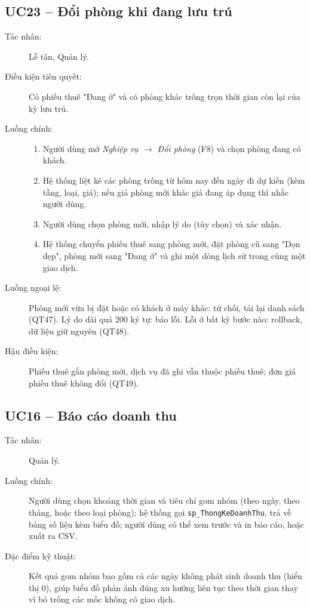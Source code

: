 \documentclass[14pt]{report}
\begin{document}
\subsection{UC23 -- Đổi phòng khi đang lưu trú}
\begin{description}
  \item[Tác nhân:] Lễ tân, Quản lý.
  \item[Điều kiện tiên quyết:] Có phiếu thuê "Đang ở" và có phòng khác trống trọn thời gian còn lại của kỳ lưu trú.
  \item[Luồng chính:]
  \begin{enumerate}
    \item Người dùng mở \textit{Nghiệp vụ $\rightarrow$ Đổi phòng} (F8) và chọn phòng đang có khách.
    \item Hệ thống liệt kê các phòng trống từ hôm nay đến ngày đi dự kiến (kèm tầng, loại, giá); nếu giá phòng mới khác giá đang áp dụng thì nhắc người dùng.
    \item Người dùng chọn phòng mới, nhập lý do (tùy chọn) và xác nhận.
    \item Hệ thống chuyển phiếu thuê sang phòng mới, đặt phòng cũ sang "Dọn dẹp", phòng mới sang "Đang ở" và ghi một dòng lịch sử trong cùng một giao dịch.
  \end{enumerate}
  \item[Luồng ngoại lệ:] Phòng mới vừa bị đặt hoặc có khách ở máy khác: từ chối, tải lại danh sách (QT47). Lý do dài quá 200 ký tự: báo lỗi. Lỗi ở bất kỳ bước nào: rollback, dữ liệu giữ nguyên (QT48).
  \item[Hậu điều kiện:] Phiếu thuê gắn phòng mới, dịch vụ đã ghi vẫn thuộc phiếu thuê; đơn giá phiếu thuê không đổi (QT49).
\end{description}

\subsection{UC16 -- Báo cáo doanh thu}
\begin{description}
  \item[Tác nhân:] Quản lý.
  \item[Luồng chính:] Người dùng chọn khoảng thời gian và tiêu chí gom nhóm (theo ngày, theo tháng, hoặc theo loại phòng); hệ thống gọi \texttt{sp\_ThongKeDoanhThu}, trả về bảng số liệu kèm biểu đồ; người dùng có thể xem trước và in báo cáo, hoặc xuất ra CSV.
  \item[Đặc điểm kỹ thuật:] Kết quả gom nhóm bao gồm cả các ngày không phát sinh doanh thu (hiển thị 0), giúp biểu đồ phản ánh đúng xu hướng liên tục theo thời gian thay vì bỏ trống các mốc không có giao dịch.
\end{description}
\end{document}
